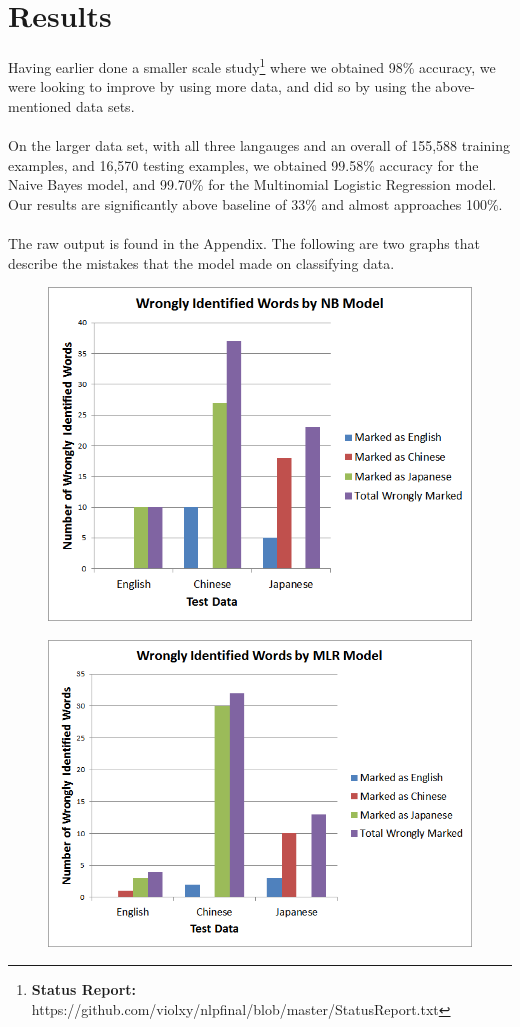\documentclass[a4paper]{article}
\begin{document}
\section{Results}
Having earlier done a smaller scale study\footnote{\textbf{Status Report:} https://github.com/violxy/nlpfinal/blob/master/StatusReport.txt} where we obtained 98\% accuracy, we were looking to improve by using more data, and did so by using the above-mentioned data sets.\\
\\On the larger data set, with all three langauges and an overall of 155,588 training examples, and 16,570 testing examples, we obtained 99.58\% accuracy for the Naive Bayes model, and 99.70\% for the Multinomial Logistic Regression model. Our results are significantly above baseline of 33\% and almost approaches 100\%.\\
\\The raw output is found in the Appendix. The following are two graphs that describe the mistakes that the model made on classifying data.
\begin{figure}[H]
\centering
\includegraphics[width=\textwidth]{nbgraph.png}
\end{figure}
\begin{figure}[H]
\centering
\includegraphics[width=\textwidth]{mlrgraph.png}
\end{figure}
\end{document}
